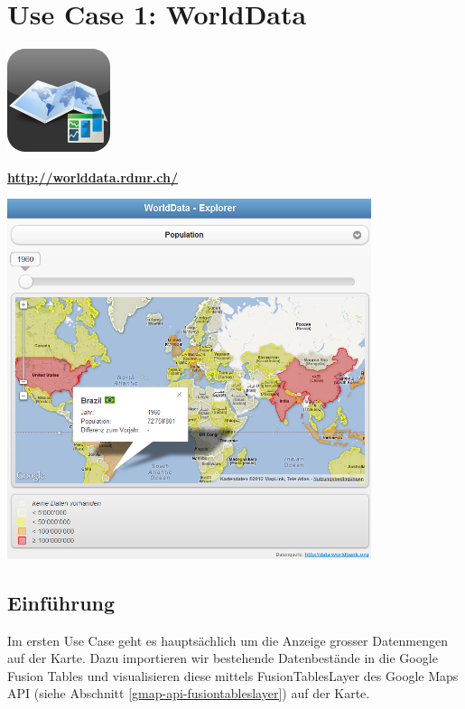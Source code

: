 \chapter{Use Case 1: WorldData}
\label{worlddata}

\begin{center}
\includegraphics[scale=0.8]{images/usecase1-worlddata/worlddata-icon_with_gloss}

{\large \textbf{\url{http://worlddata.rdmr.ch/}}}

\vspace{1cm}

\includegraphics[width=0.8\textwidth]{images/usecase1-worlddata/screenshots/worlddata-screenshots-population_1960}
\end{center}

\section{Einführung}
Im ersten Use Case geht es hauptsächlich um die Anzeige grosser Datenmengen auf der Karte. Dazu importieren wir bestehende Datenbestände in die Google Fusion Tables und visualisieren diese mittels FusionTablesLayer des Google Maps \gls{API} (siehe Abschnitt \ref{gmap-api-fusiontableslayer}) auf der Karte.

